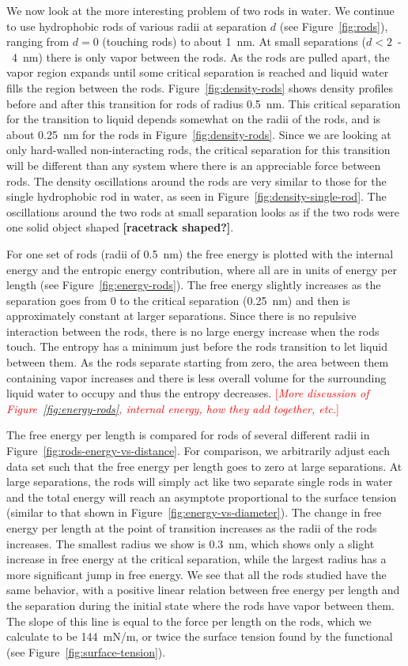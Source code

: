 \documentclass[letterpaper,twocolumn,amsmath,amssymb,prb]{revtex4-1}
\newcommand{\red}[1]{{\bf \color{red} #1}}
\newcommand{\fixme}[1]{\red{[#1]}}
\newcommand{\needsworknow}[1]{\textcolor{red}{[\emph{#1}]}}
\begin{document}
We now look at the more interesting problem of two rods in water. We continue to
use hydrophobic rods of various radii at separation $d$ (see Figure~\ref{fig:rods}), ranging from $d=0$ 
(touching rods) to about 1~nm. At small
separations ($d<2$~-~4~nm) there is only vapor between the rods. As the rods are
pulled apart, the vapor region expands until some critical separation is
reached and liquid water fills the region between the rods. Figure~\ref{fig:density-rods} 
shows density profiles before and after this transition
for rods of radius 0.5~nm. This critical separation for the transition to liquid depends
somewhat on the radii of the rods, and is about 0.25~nm for the rods in Figure~\ref{fig:density-rods}.
Since we are looking at only hard-walled
non-interacting rods, the critical separation for this transition will be
different than any system where there is an appreciable force between rods. 
The density oscillations  around the rods are very similar to
those for the single hydrophobic rod in water, as seen in Figure~\ref{fig:density-single-rod}.
The oscillations around the two rods at small separation looks as if the two rods were one
solid object shaped \fixme{racetrack shaped?}.

For one set of rods (radii of 0.5~nm) the free energy is plotted with the internal energy
and the entropic energy contribution, where all are in units of energy per length 
(see Figure~\ref{fig:energy-rods}). The free energy slightly increases as the separation
goes from 0 to the critical separation (0.25~nm) and then is approximately constant at
larger separations. Since there is no repulsive interaction between the rods, there is no
large energy increase when the rods touch. The entropy has a minimum just before the rods
transition to let liquid between them. As the rods separate starting from zero, the area 
between them containing vapor increases and there is less overall volume for the 
surrounding liquid water to occupy and thus the entropy decreases. 
\needsworknow{More discussion of Figure~\ref{fig:energy-rods}, internal energy, how they add
together, etc.}

The free energy per length is compared for rods of several different radii
in Figure~\ref{fig:rods-energy-vs-distance}. For comparison, we arbitrarily adjust each data set such that the
free energy per length goes to zero at large separations. At large separations, the rods will 
simply act like two separate single rods in water and the total energy will
reach an asymptote proportional to the surface tension (similar to that shown in 
Figure~\ref{fig:energy-vs-diameter}).
The change in free energy per length at the point of transition increases as the radii of
the rods increases. The smallest radius we show is 0.3~nm, which shows only a slight increase in
free energy at the critical separation, while the largest radius has a more significant jump in free energy. 
We see that all the rods studied have the same behavior, with a positive linear relation between free energy
per length and the separation during the initial state where the rods have vapor between them. 
The slope of this line is equal to the force per length on the rods, which we calculate to be 144~mN/m, 
or twice the surface tension
found by the functional (see Figure~\ref{fig:surface-tension}).
\end{document}
